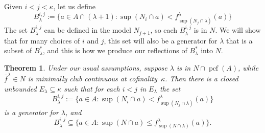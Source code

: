 \documentclass[10pt]{amsart}
\theoremstyle{plain}
\newtheorem{theorem}{Theorem}
\theoremstyle{definition}
\theoremstyle{remark}
\DeclareMathOperator{\pcf}{pcf}
\numberwithin{equation}{section}
\begin{document}
Given $i<j<\kappa$, let us define
\begin{equation}
B^{i,j}_\lambda:=\{a\in A\cap(\lambda+1): \sup(N_i\cap a)< f^\lambda_{\sup(N_j\cap\lambda)}(a)\}
\end{equation}
The set $B^{i,j}_\lambda$ can be defined in the model $N_{j+1}$, so each $B^{i,j}_\lambda$ is in $N$.  We will show that for many
choices of $i$ and $j$, this set will also be a generator for $\lambda$ that is a subset of $B^*_\lambda$, and this is how we
produce our reflections of $B^*_\lambda$ into $N$.

\begin{theorem}
Under our usual assumptions, suppose $\lambda$ is in $N\cap\pcf(A)$, while $\bar{f}^\lambda\in N$ is minimally club continuous at
 cofinality~$\kappa$. Then there is a closed unbounded $E_\lambda\subseteq\kappa$ such that for each $i<j$ in $E_\lambda$ the set
\begin{equation}
B^{i,j}_\lambda:=\{a\in A: \sup(N_i\cap a)< f^\lambda_{\sup(N_j\cap\lambda)}(a)\}
\end{equation}
is a generator for $\lambda$, and
\begin{equation}
B^{i,j}_\lambda\subseteq\{a\in A: \sup(N\cap a)\leq f^\lambda_{\sup(N\cap\lambda)}(a)\}.
\end{equation}
\end{theorem}
\end{document}
